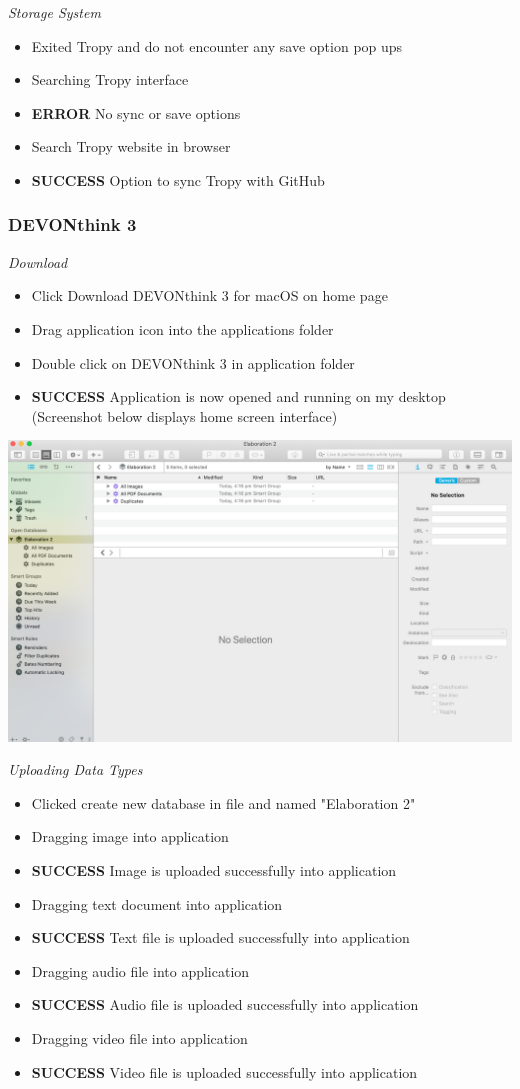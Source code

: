 \documentclass{article}
\begin{document}
\textit{Storage System}
\begin{itemize}
\item Exited Tropy and do not encounter any save option pop ups
\item Searching Tropy interface
\item \textbf{ERROR} No sync or save options
\item Search Tropy website in browser
\item \textbf{SUCCESS} Option to sync Tropy with GitHub
\end{itemize}


\subsubsection{DEVONthink 3}
\textit{Download}
\begin{itemize}
\item Click Download DEVONthink 3 for macOS on home page
\item Drag application icon into the applications folder
\item Double click on DEVONthink 3 in application folder
\item \textbf{SUCCESS} Application is now opened and running on my desktop (Screenshot below displays home screen interface)
\end{itemize}

\includegraphics[width=\textwidth]{Images/DEVONinterface.png}

\textit{Uploading Data Types}
\begin{itemize}
\item Clicked create new database in file and named "Elaboration 2"
\item Dragging image into application
\item \textbf{SUCCESS} Image is uploaded successfully into application
\item Dragging text document into application
\item \textbf{SUCCESS} Text file is uploaded successfully into application
\item Dragging audio file into application
\item \textbf{SUCCESS} Audio file is uploaded successfully into application
\item Dragging video file into application
\item \textbf{SUCCESS} Video file is uploaded successfully into application
\end{itemize}
\end{document}

